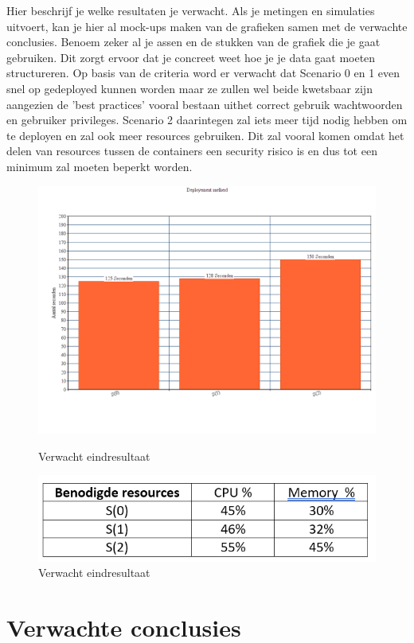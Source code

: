 Hier beschrijf je welke resultaten je verwacht. Als je metingen en simulaties uitvoert, kan je hier al mock-ups maken van de grafieken samen met de verwachte conclusies. Benoem zeker al je assen en de stukken van de grafiek die je gaat gebruiken. Dit zorgt ervoor dat je concreet weet hoe je je data gaat moeten structureren.
Op basis van de criteria word er verwacht dat Scenario 0 en 1 even snel op gedeployed kunnen worden maar ze zullen wel beide kwetsbaar zijn aangezien de 'best practices' vooral bestaan uithet correct gebruik wachtwoorden en gebruiker privileges.
Scenario 2 daarintegen zal iets meer tijd nodig hebben om te deployen en zal ook meer resources gebruiken. Dit zal vooral komen omdat het delen van resources tussen de containers een security risico is en dus tot een minimum zal moeten beperkt worden.\autocite{Education2019} 
\begin{figure}[ht]
	\includegraphics[scale=0.27]{img/Mock1.png}
	\caption{Verwacht eindresultaat}
	\label{fig:example}
	\includegraphics[scale=0.50]{img/Mock2.png}
	\caption{Verwacht eindresultaat}
  \label{fig:example}
\end{figure}
\section{Verwachte conclusies}
\label{sec:verwachte_conclusies}

